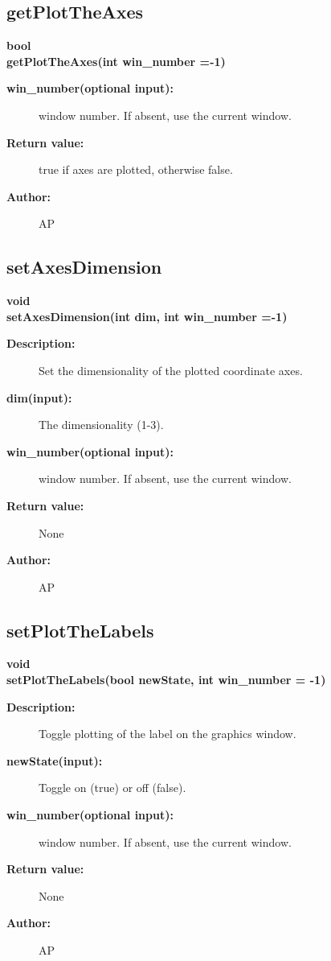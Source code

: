 \subsection{getPlotTheAxes}
 
\begin{flushleft} \textbf{%
bool  \\ 
\settowidth{\GLGraphicsInterfaceIncludeArgIndent}{getPlotTheAxes(}%
getPlotTheAxes(int win\_number  =-1)
}\end{flushleft}
\begin{description}
\item[{\bf win\_number(optional input):}]  window number. If absent, use the current window.

\item[{\bf Return value:}]  true if axes are plotted, otherwise false.
\item[{\bf Author:}]  AP
\end{description}
\subsection{setAxesDimension}
 
\begin{flushleft} \textbf{%
void  \\ 
\settowidth{\GLGraphicsInterfaceIncludeArgIndent}{setAxesDimension(}%
setAxesDimension(int dim, int win\_number  =-1)
}\end{flushleft}
\begin{description}
\item[{\bf Description:}] 
 Set the dimensionality of the plotted coordinate axes.
\item[{\bf dim(input):}]  The dimensionality (1-3).
\item[{\bf win\_number(optional input):}]  window number. If absent, use the current window.

\item[{\bf Return value:}]  None
\item[{\bf Author:}]  AP
\end{description}
\subsection{setPlotTheLabels}
 
\begin{flushleft} \textbf{%
void  \\ 
\settowidth{\GLGraphicsInterfaceIncludeArgIndent}{setPlotTheLabels(}%
setPlotTheLabels(bool newState, int win\_number  = -1) 
}\end{flushleft}
\begin{description}
\item[{\bf Description:}] 
 Toggle plotting of the label on the graphics window.
\item[{\bf newState(input):}]  Toggle on (true) or off (false).
\item[{\bf win\_number(optional input):}]  window number. If absent, use the current window.

\item[{\bf Return value:}]  None
\item[{\bf Author:}]  AP
\end{description}
